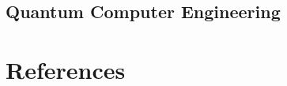 \documentclass{beamer}
\begin{document}
\subsection{Quantum Computer Engineering}







\section{References}

\end{document}
